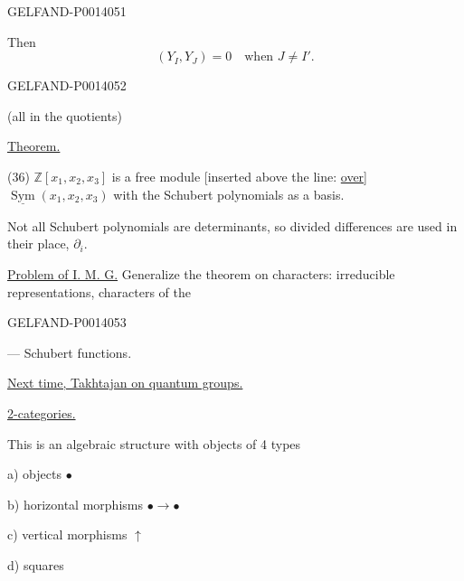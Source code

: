 \begin{GelfandAdjacentEvidence}{GELFAND-P001405}{1}

Then
\begin{equation*}
(Y_I,Y_J)=0\quad\text{when }J\ne I'. \tag{35}
\end{equation*}
\end{GelfandAdjacentEvidence}
\begin{GelfandAdjacentEvidence}{GELFAND-P001405}{2}

(all in the quotients)

\uline{Theorem.}

(36) \(\mathbb{Z}[x_1,x_2,x_3]\) is a free module
[inserted above the line: \uline{over}]
\(\underline{\operatorname{Sym}}(x_1,x_2,x_3)\)
with the Schubert polynomials as a basis.

Not all Schubert polynomials are determinants, so divided differences are used in their place, \(\partial_i\).

\uline{Problem of I. M. G.} Generalize the theorem on characters: irreducible representations, characters of the
\end{GelfandAdjacentEvidence}
\begin{GelfandAdjacentEvidence}{GELFAND-P001405}{3}

— Schubert functions.

\uline{Next time, Takhtajan on quantum groups.}


\uline{2-categories.}

This is an algebraic structure with objects of 4 types

a) objects \(\bullet\)

b) horizontal morphisms \(\bullet\longrightarrow\bullet\)

c) vertical morphisms \(\uparrow\)

d) squares

\end{GelfandAdjacentEvidence}
